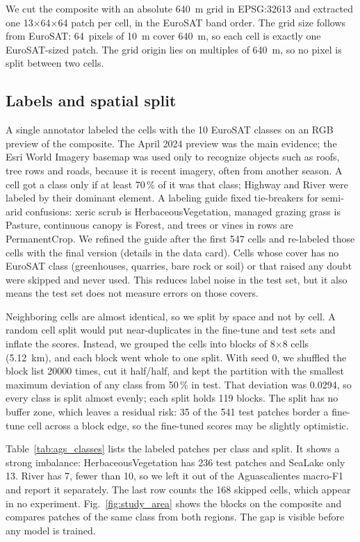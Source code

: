 We cut the composite with an absolute 640~m grid in EPSG:32613 and extracted one
13$\times$64$\times$64 patch per cell, in the EuroSAT band order. The grid size follows from
EuroSAT: 64~pixels of 10~m cover 640~m, so each cell is exactly one EuroSAT-sized patch. The grid
origin lies on multiples of 640~m, so no pixel is split between two cells.

\subsection{Labels and spatial split}

A single annotator labeled the cells with the 10 EuroSAT classes on an RGB preview of the
composite. The April 2024 preview was the main evidence; the Esri World Imagery basemap was used
only to recognize objects such as roofs, tree rows and roads, because it is recent imagery,
often from another season. A cell got a class only if at least 70\,\% of it was that class; Highway and River
were labeled by their dominant element. A labeling guide fixed tie-breakers for
semi-arid confusions: xeric scrub is HerbaceousVegetation, managed grazing grass is Pasture,
continuous canopy is Forest, and trees or vines in rows are PermanentCrop. We refined the guide
after the first 547 cells and re-labeled those cells with the final version (details in the
data card). Cells whose cover has
no EuroSAT class (greenhouses, quarries, bare rock or soil) or that raised any doubt were
skipped and never used. This reduces label noise in the test set, but it also means the test
set does not measure errors on those covers.

Neighboring cells are almost identical, so we split by space and not by cell. A random cell
split would put near-duplicates in the fine-tune and test sets and inflate the scores. Instead,
we grouped the cells into blocks of 8$\times$8 cells (5.12~km), and each block went whole to
one split. With seed 0, we shuffled the block list \num{20000} times, cut it half/half, and kept the
partition with the smallest maximum deviation of any class from 50\,\% in test. That deviation
was 0.0294, so every class is split almost evenly; each split holds 119 blocks. The split has
no buffer zone, which leaves a residual risk: 35 of the 541 test patches border a fine-tune
cell across a block edge, so the fine-tuned scores may be slightly optimistic.

Table~\ref{tab:ags_classes} lists the labeled patches per class and split. It shows a strong
imbalance: HerbaceousVegetation has 236 test patches and SeaLake only 13. River has 7, fewer
than 10, so we left it out of the Aguascalientes macro-F1 and report it separately. The last row
counts the 168 skipped cells, which appear in no experiment.
Fig.~\ref{fig:study_area} shows the blocks on the composite and compares patches of the same
class from both regions. The gap is visible before any model is trained.


